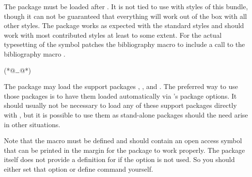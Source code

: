 \documentclass[DIV=9]{scrartcl}
\begin{document}
The package must be loaded after .
It is not tied to use with styles of this bundle, though it can not be
guaranteed that everything will work out of the box with all other styles.
The package works as expected with the standard styles and
should work with most contributed styles at least to some extent.
For the actual typesetting of the symbol 
patches the bibliography macro  to include a call to the
bibliography macro .
\begin{biblatexcode}
\usepackage[(*@@*)]{biblatex}
(*@\dots @*)
\usepackage[(*@@*)]{biblatex-ext-oa}
\end{biblatexcode}

The package may load the support packages
,
,
and .
The preferred way to use those packages is to have them loaded
automatically via 's package options.
It should usually not be necessary to load any of these support packages
directly with , but it is possible to use them as
stand-alone packages should the need arise in other situations.

\begin{warnbox}
Note that the macro  must be defined and should contain an
open access symbol that can be printed in the margin for the package
 to work properly.
The package  itself does not provide a definition for
 if the option  is not used.
So you should either set that option or define command 
yourself.
\end{warnbox}
\end{document}
